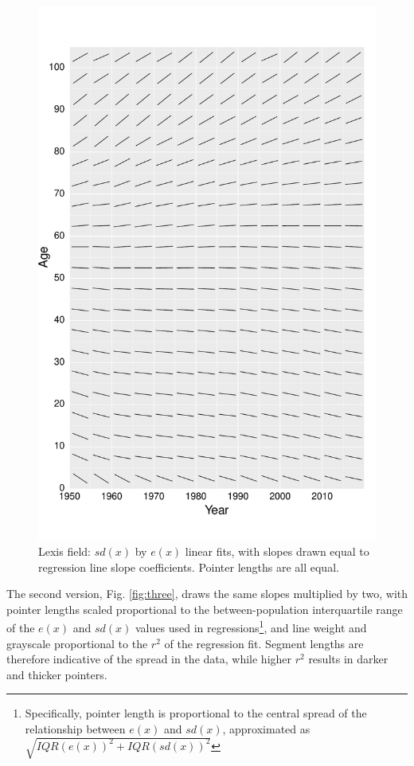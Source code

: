 \documentclass[10pt, twoside, parskip=half]{article}
\begin{document}
\begin{figure}[!t]

{\centering \includegraphics[width=0.8\linewidth]{Figures/FigApp1} 

}

\caption{Lexis field: \(sd(x)\) by \(e(x)\) linear fits, with slopes drawn equal to regression line slope coefficients. Pointer lengths are all equal.}\label{fig:two}
\end{figure}

The second version, Fig. \ref{fig:three}, draws the same slopes multiplied by two, with pointer lengths scaled proportional to the between-population interquartile range of the \(e(x)\) and \(sd(x)\) values used in regressions\footnote{Specifically, pointer length is proportional to the central spread of the relationship between \(e(x)\) and \(sd(x)\), approximated as \(\sqrt{IQR(e(x))^2 + IQR(sd(x))^2}\)}, and line weight and grayscale proportional to the \(r^2\) of the regression fit. Segment lengths are therefore indicative of the spread in the data, while higher \(r^2\) results in darker and thicker pointers.
\end{document}

